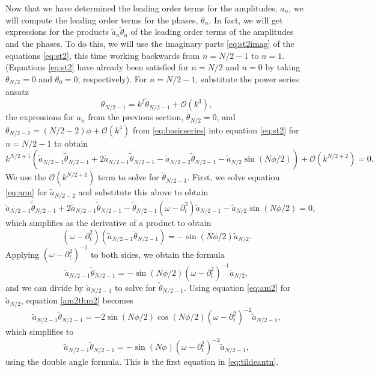 \documentclass[11pt,reqno]{amsart}
\begin{document}
Now that we have determined the leading order terms for the amplitudes, $a_n$, we will compute the leading order terms for the phases, $\theta_n$. In fact, we will get expressions for the products $\widetilde{a}_n \widetilde{\theta}_n$ of the leading order terms of the amplitudes and the phases. To do this, we will use the imaginary parts \cref{eq:st2imag} of the equations \cref{eq:st2}, this time working backwards from $n = N/2-1$ to $n=1$. (Equations \cref{eq:st2} have already been satisfied for $n=N/2$ and $n=0$ by taking $\theta_{N/2} = 0$ and $\theta_0 = 0$, respectively). For $n=N/2-1$, substitute the power series ansatz
\[
\theta_{N/2-1} = k^2 \widetilde{\theta}_{N/2-1} + \mathcal{O}(k^{3}),
\]
the expressions for $a_n$ from the previous section, $\theta_{N/2} = 0$, and
$\theta_{N/2-2} = (N/2-2)\phi + \mathcal{O}(k^4)$ from \cref{eq:basicseries} into equation \cref{eq:st2} for $n=N/2-1$ to obtain
\[
k^{N/2+1} \left( \widetilde{a}_{N/2-1} \ddot{\widetilde{\theta}}_{N/2-1} + 2 \dot{\widetilde{a}}_{N/2-1} \dot{\widetilde{\theta}}_{N/2-1} - \widetilde{a}_{N/2-2} \widetilde{\theta}_{N/2-1} - \widetilde{a}_{N/2} \sin(N \phi/2) \right) + \mathcal{O}(k^{N/2+2}) = 0.
\]
We use the $\mathcal{O}(k^{N/2+1})$ term to solve for $\widetilde{\theta}_{N/2-1}$. First, we solve equation \cref{eq:ann} for $\widetilde{a}_{N/2-2}$ and substitute this above to obtain
\[
\widetilde{a}_{N/2-1} \ddot{\widetilde{\theta}}_{N/2-1} + 2 \dot{\widetilde{a}}_{N/2-1} \dot{\widetilde{\theta}}_{N/2-1} - \widetilde{\theta}_{N/2-1} (\omega - \partial_t^2) \widetilde{a}_{N/2-1} - \widetilde{a}_{N/2} \sin(N \phi/2) = 0,
\]
which simplifies as the derivative of a product to obtain
\[
(\omega - \partial_t^2)\left( \widetilde{a}_{N/2-1} \widetilde{\theta}_{N/2-1} \right) = -\sin(N \phi/2) \widetilde{a}_{N/2}.
\]
Applying $(\omega - \partial_t^2)^{-1}$ to both sides, we obtain the formula
\begin{equation}\label{am2thm2}
\widetilde{a}_{N/2-1} \widetilde{\theta}_{N/2-1} = -\sin(N \phi/2) (\omega - \partial_t^2)^{-1} \widetilde{a}_{N/2},
\end{equation}
and we can divide by $\widetilde{a}_{N/2-1}$ to solve for $\widetilde{\theta}_{N/2-1}$. Using equation \cref{eq:am2} for $\widetilde{a}_{N/2}$, equation \cref{am2thm2} becomes
\[
\widetilde{a}_{N/2-1} \widetilde{\theta}_{N/2-1} = -2 \sin(N \phi/2) \cos( N\phi/2) (\omega - \partial_t^2)^{-2} \widetilde{a}_{N/2-1},
\]
which simplifies to 
\begin{equation}\label{am2thm2a}
\widetilde{a}_{N/2-1} \widetilde{\theta}_{N/2-1} = -\sin(N \phi) (\omega - \partial_t^2)^{-2} \widetilde{a}_{N/2-1},
\end{equation}
using the double angle formula. This is the first equation in \cref{eq:tildeantn}.
\end{document}
